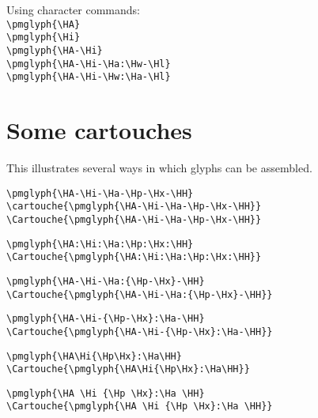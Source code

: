 \documentclass{article}
\begin{document}
    Using character commands: \\
\verb|\pmglyph{\HA}| \pmglyph{\HA} \\
\verb|\pmglyph{\Hi}| \pmglyph{\Hi} \\
\verb|\pmglyph{\HA-\Hi}| \pmglyph{\HA-\Hi} \\
\verb|\pmglyph{\HA-\Hi-\Ha:\Hw-\Hl}| \pmglyph{\HA-\Hi-\Ha:\Hw-\Hl} \\
\verb|\pmglyph{\HA-\Hi-\Hw:\Ha-\Hl}| \pmglyph{\HA-\Hi-\Hw:\Ha-\Hl}

\section{Some cartouches}

    This illustrates several ways in which glyphs can be assembled.

\verb|\pmglyph{\HA-\Hi-\Ha-\Hp-\Hx-\HH}| \\
\verb|\cartouche{\pmglyph{\HA-\Hi-\Ha-\Hp-\Hx-\HH}}| \\
\verb|\Cartouche{\pmglyph{\HA-\Hi-\Ha-\Hp-\Hx-\HH}}| \\
\pmglyph{\HA-\Hi-\Ha-\Hp-\Hx-\HH}
\cartouche{\pmglyph{\HA-\Hi-\Ha-\Hp-\Hx-\HH}}
\Cartouche{\pmglyph{\HA-\Hi-\Ha-\Hp-\Hx-\HH}}

\verb|\pmglyph{\HA:\Hi:\Ha:\Hp:\Hx:\HH}| \\
\verb|\Cartouche{\pmglyph{\HA:\Hi:\Ha:\Hp:\Hx:\HH}}| \\
\pmglyph{\HA:\Hi:\Ha:\Hp:\Hx:\HH}
\Cartouche{\pmglyph{\HA:\Hi:\Ha:\Hp:\Hx:\HH}}

\verb|\pmglyph{\HA-\Hi-\Ha:{\Hp-\Hx}-\HH}| \\
\verb|\Cartouche{\pmglyph{\HA-\Hi-\Ha:{\Hp-\Hx}-\HH}}| \\
\pmglyph{\HA-\Hi-\Ha:{\Hp-\Hx}-\HH}
\Cartouche{\pmglyph{\HA-\Hi-\Ha:{\Hp-\Hx}-\HH}}


\verb|\pmglyph{\HA-\Hi-{\Hp-\Hx}:\Ha-\HH}| \\
\verb|\Cartouche{\pmglyph{\HA-\Hi-{\Hp-\Hx}:\Ha-\HH}}| \\
\pmglyph{\HA-\Hi-{\Hp-\Hx}:\Ha-\HH}
\Cartouche{\pmglyph{\HA-\Hi-{\Hp-\Hx}:\Ha-\HH}}

\verb|\pmglyph{\HA\Hi{\Hp\Hx}:\Ha\HH}| \\
\verb|\Cartouche{\pmglyph{\HA\Hi{\Hp\Hx}:\Ha\HH}}| \\
\pmglyph{\HA\Hi{\Hp\Hx}:\Ha\HH}
\Cartouche{\pmglyph{\HA\Hi{\Hp\Hx}:\Ha\HH}}

\verb|\pmglyph{\HA \Hi {\Hp \Hx}:\Ha \HH}| \\
\verb|\Cartouche{\pmglyph{\HA \Hi {\Hp \Hx}:\Ha \HH}}| \\
\pmglyph{\HA \Hi {\Hp \Hx}:\Ha \HH}
\Cartouche{\pmglyph{\HA \Hi {\Hp \Hx}:\Ha \HH}}
\end{document}
